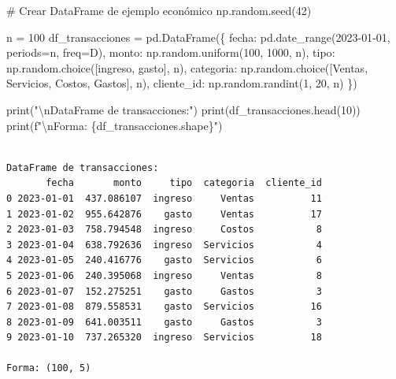 \documentclass[
  doc,
  floatsintext,
  longtable,
  a4paper,
  nolmodern,
  notxfonts,
  notimes,
  12pt,
  colorlinks=true,linkcolor=blue,citecolor=blue,urlcolor=blue]{apa7}
\newenvironment{Shaded}{\begin{snugshade}}{\end{snugshade}}
\newcommand{\BuiltInTok}[1]{\textcolor[rgb]{0.00,0.23,0.31}{#1}}
\newcommand{\CharTok}[1]{\textcolor[rgb]{0.13,0.47,0.30}{#1}}
\newcommand{\CommentTok}[1]{\textcolor[rgb]{0.37,0.37,0.37}{#1}}
\newcommand{\DecValTok}[1]{\textcolor[rgb]{0.68,0.00,0.00}{#1}}
\newcommand{\NormalTok}[1]{\textcolor[rgb]{0.00,0.23,0.31}{#1}}
\newcommand{\OperatorTok}[1]{\textcolor[rgb]{0.37,0.37,0.37}{#1}}
\newcommand{\SpecialCharTok}[1]{\textcolor[rgb]{0.37,0.37,0.37}{#1}}
\newcommand{\SpecialStringTok}[1]{\textcolor[rgb]{0.13,0.47,0.30}{#1}}
\newcommand{\StringTok}[1]{\textcolor[rgb]{0.13,0.47,0.30}{#1}}
\begin{document}
\begin{Shaded}
\begin{Highlighting}[]
\CommentTok{\# Crear DataFrame de ejemplo económico}
\NormalTok{np.random.seed(}\DecValTok{42}\NormalTok{)}

\NormalTok{n }\OperatorTok{=} \DecValTok{100}
\NormalTok{df\_transacciones }\OperatorTok{=}\NormalTok{ pd.DataFrame(\{}
    \StringTok{\textquotesingle{}fecha\textquotesingle{}}\NormalTok{: pd.date\_range(}\StringTok{\textquotesingle{}2023{-}01{-}01\textquotesingle{}}\NormalTok{, periods}\OperatorTok{=}\NormalTok{n, freq}\OperatorTok{=}\StringTok{\textquotesingle{}D\textquotesingle{}}\NormalTok{),}
    \StringTok{\textquotesingle{}monto\textquotesingle{}}\NormalTok{: np.random.uniform(}\DecValTok{100}\NormalTok{, }\DecValTok{1000}\NormalTok{, n),}
    \StringTok{\textquotesingle{}tipo\textquotesingle{}}\NormalTok{: np.random.choice([}\StringTok{\textquotesingle{}ingreso\textquotesingle{}}\NormalTok{, }\StringTok{\textquotesingle{}gasto\textquotesingle{}}\NormalTok{], n),}
    \StringTok{\textquotesingle{}categoria\textquotesingle{}}\NormalTok{: np.random.choice([}\StringTok{\textquotesingle{}Ventas\textquotesingle{}}\NormalTok{, }\StringTok{\textquotesingle{}Servicios\textquotesingle{}}\NormalTok{, }\StringTok{\textquotesingle{}Costos\textquotesingle{}}\NormalTok{, }\StringTok{\textquotesingle{}Gastos\textquotesingle{}}\NormalTok{], n),}
    \StringTok{\textquotesingle{}cliente\_id\textquotesingle{}}\NormalTok{: np.random.randint(}\DecValTok{1}\NormalTok{, }\DecValTok{20}\NormalTok{, n)}
\NormalTok{\})}

\BuiltInTok{print}\NormalTok{(}\StringTok{"}\CharTok{\textbackslash{}n}\StringTok{DataFrame de transacciones:"}\NormalTok{)}
\BuiltInTok{print}\NormalTok{(df\_transacciones.head(}\DecValTok{10}\NormalTok{))}
\BuiltInTok{print}\NormalTok{(}\SpecialStringTok{f"}\CharTok{\textbackslash{}n}\SpecialStringTok{Forma: }\SpecialCharTok{\{}\NormalTok{df\_transacciones}\SpecialCharTok{.}\NormalTok{shape}\SpecialCharTok{\}}\SpecialStringTok{"}\NormalTok{)}
\end{Highlighting}
\end{Shaded}

\begin{verbatim}

DataFrame de transacciones:
       fecha       monto     tipo  categoria  cliente_id
0 2023-01-01  437.086107  ingreso     Ventas          11
1 2023-01-02  955.642876    gasto     Ventas          17
2 2023-01-03  758.794548  ingreso     Costos           8
3 2023-01-04  638.792636  ingreso  Servicios           4
4 2023-01-05  240.416776    gasto  Servicios           6
5 2023-01-06  240.395068  ingreso     Ventas           8
6 2023-01-07  152.275251    gasto     Gastos           3
7 2023-01-08  879.558531    gasto  Servicios          16
8 2023-01-09  641.003511    gasto     Gastos           3
9 2023-01-10  737.265320  ingreso  Servicios          18

Forma: (100, 5)
\end{verbatim}
\end{document}
